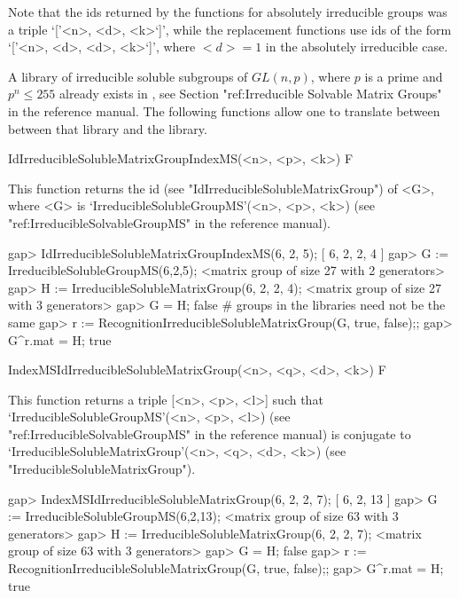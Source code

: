 Note that the ids returned by the functions for absolutely irreducible groups was a triple `['<n>, <d>, <k>`]', while the replacement functions use ids of the form `['<n>, <d>, <d>, <k>`]', where $<d> = 1$ in the absolutely irreducible case.


\null


A library of irreducible soluble subgroups of $GL(n, p)$, where $p$ is a 
prime and $p^n \leq 255$ already exists in {\GAP}, see Section "ref:Irreducible Solvable Matrix Groups" in the {\GAP} reference manual. The following functions
allow one to translate between between that library and the {\IRREDSOL} library. 


\>IdIrreducibleSolubleMatrixGroupIndexMS(<n>, <p>, <k>) F

This function returns the id (see "IdIrreducibleSolubleMatrixGroup") of <G>, 
where <G> is `IrreducibleSolubleGroupMS'(<n>, <p>, <k>) (see "ref:IrreducibleSolvableGroupMS" in the {\GAP} reference manual).

\beginexample
gap> IdIrreducibleSolubleMatrixGroupIndexMS(6, 2, 5);
[ 6, 2, 2, 4 ]
gap> G := IrreducibleSolubleGroupMS(6,2,5);
<matrix group of size 27 with 2 generators>
gap> H := IrreducibleSolubleMatrixGroup(6, 2, 2, 4);
<matrix group of size 27 with 3 generators>
gap> G = H;
false 
# groups in the libraries need not be the same
gap> r := RecognitionIrreducibleSolubleMatrixGroup(G, true, false);;
gap> G^r.mat = H;
true
\endexample

\>IndexMSIdIrreducibleSolubleMatrixGroup(<n>, <q>, <d>, <k>) F

This function returns a triple [<n>, <p>, <l>] such that
`IrreducibleSolubleGroupMS'(<n>, <p>, <l>) (see "ref:IrreducibleSolvableGroupMS" in the {\GAP} reference manual) is conjugate to
`IrreducibleSolubleMatrixGroup'(<n>, <q>, <d>, <k>) (see "IrreducibleSolubleMatrixGroup").

\beginexample
gap> IndexMSIdIrreducibleSolubleMatrixGroup(6, 2, 2, 7);
[ 6, 2, 13 ]
gap> G := IrreducibleSolubleGroupMS(6,2,13);
<matrix group of size 63 with 3 generators>
gap> H := IrreducibleSolubleMatrixGroup(6, 2, 2, 7);
<matrix group of size 63 with 3 generators>
gap> G = H;
false 
gap> r := RecognitionIrreducibleSolubleMatrixGroup(G, true, false);;
gap> G^r.mat = H;
true
\endexample


\null

